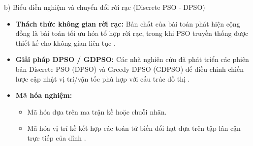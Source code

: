 \documentclass[14pt,a4paper]{extarticle}
\begin{document}
\noindent b) Biểu diễn nghiệm và chuyển đổi rời rạc (Discrete PSO - DPSO)
\begin{itemize}
    \item \textbf{Thách thức không gian rời rạc:} Bản chất của bài toán phát hiện cộng đồng là bài toán tối ưu hóa tổ hợp rời rạc, trong khi PSO truyền thống được thiết kế cho không gian liên tục \cite{Baraa2021, Beldi2025}.
    \item \textbf{Giải pháp DPSO / GDPSO:} Các nhà nghiên cứu đã phát triển các phiên bản Discrete PSO (DPSO) và Greedy DPSO (GDPSO) để điều chỉnh chiến lược cập nhật vị trí/vận tốc phù hợp với cấu trúc đồ thị \cite{Beldi2025}.
    \item \textbf{Mã hóa nghiệm:}
    \begin{itemize}
        \item Mã hóa dựa trên ma trận kề hoặc chuỗi nhãn.
        \item Mã hóa vị trí kề kết hợp các toán tử biến đổi hạt dựa trên tập lân cận trực tiếp của đỉnh \cite{Baraa2021, Beldi2025}.
    \end{itemize}
\end{itemize}
\end{document}
